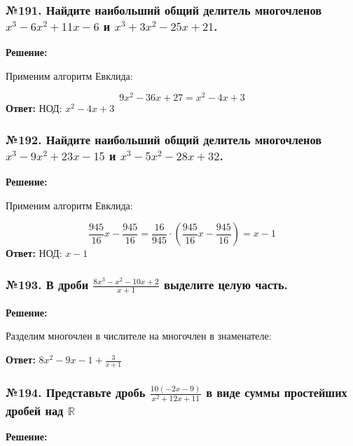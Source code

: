 \documentclass[a4paper]{article}
\begin{document}
\subsubsection*{№191. Найдите наибольший общий делитель многочленов $x^3-6x^2+11x-6$ и $x^3+3x^2-25x+21$.}
\textbf{Решение:} \par

Применим алгоритм Евклида: \par
{} \par
{} \par
{}
\[9x^2-36x+27=x^2-4x+3\]
\textbf{Ответ:} НОД: $x^2-4x+3$

\subsubsection*{№192. Найдите наибольший общий делитель многочленов $x^3-9x^2+23x-15$ и $x^3-5x^2-28x+32$.}
\textbf{Решение:} \par

Применим алгоритм Евклида: \par
{} \par
{} \par
{} \par
{}
\[\frac{945}{16}x-\frac{945}{16}=\frac{16}{945}\cdot(\frac{945}{16}x-\frac{945}{16})=x-1\]
\textbf{Ответ:} НОД: $x-1$

\subsubsection*{№193. В дроби $\frac{8x^3-x^2-10x+2}{x+1}$ выделите целую часть.}
\textbf{Решение:} \par
Разделим многочлен в числителе на многочлен в знаменателе: \par
{} \par
\textbf{Ответ:} $8x^2-9x-1+\frac{3}{x+1}$

\subsubsection*{№194. Представьте дробь $\frac{10(-2x-9)}{x^2+12x+11}$ в виде суммы простейших дробей над $\mathbb{R}$}
\textbf{Решение:} \par
\end{document}
